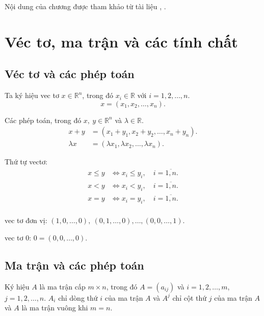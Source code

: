 \documentclass[12pt,a4paper]{report}
\begin{document}
Nội dung của chương được tham khảo từ tài liệu \cite{phanhoangchon}, \cite{lay2003linear}.

\section{ Véc tơ, ma trận và các tính chất}

\subsection{ Véc tơ và các phép toán }

Ta ký hiệu vec tơ $x \in \mathbb{R}^n$, trong đó $x_i \in \mathbb{R}$ với $i=1,2,\ldots,n$.
\begin{equation*}
x=(x_1,x_2,\ldots,x_n).
\end{equation*}
 
Các phép toán, trong đó $x, \: y \in \mathbb{R}^n$ và $\lambda \in \mathbb{R}$.
\begin{equation*}
\begin{split}
x + y &= (x_1 + y_1, x_2 + y_2 , \ldots , x_n +y_n). \\
\lambda x &= (\lambda x_1 , \lambda x_2 , \ldots , \lambda x_n).
\end{split}
\end{equation*}

Thứ tự vectơ:
\begin{equation*}
\begin{split}
x \leq y & \Leftrightarrow x_i \leq y_i, \quad i= \overline{1,n}. \\
x < y & \Leftrightarrow x_i < y_i,  \quad i= \overline{1,n}.\\
x = y & \Leftrightarrow x_i = y_i, \quad i= \overline{1,n}. \\
\end{split}
\end{equation*}

 vec tơ đơn vị: $(1,0,\ldots,0),\:(0,1,\ldots,0) , \ldots , (0,0,\ldots,1)$.

 vec tơ $0$: $0=(0,0,\ldots,0)$. 

\subsection{ Ma trận và các phép toán}
 Ký hiệu $A$ là ma trận cấp $m\times n$, trong đó $A=(a_{ij})$ và $i=1,2,\ldots,m$, $j=1,2,\ldots,n$. $A_i$ chỉ dòng thứ $i$ của ma trận $A$ và $A^j$ chỉ cột thứ $j$ của ma trận $A$ và $A$ là ma trận vuông khi $m=n$.
\end{document}
